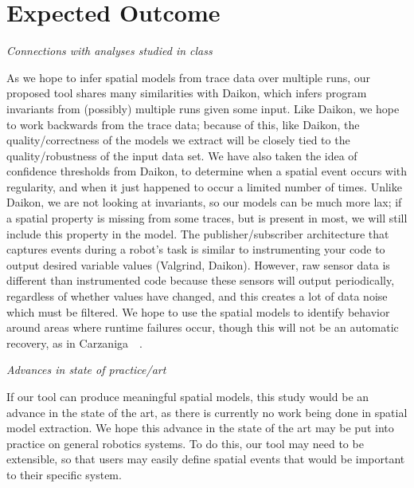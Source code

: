 \section{Expected Outcome} 

\emph{Connections with analyses studied in class}

As we hope to infer spatial models from trace data over multiple runs, our proposed tool shares many similarities with Daikon, which infers program invariants from (possibly) multiple runs given some input.
Like Daikon, we hope to work backwards from the trace data; because of this, like Daikon, the quality/correctness of the models we extract will be closely tied to the quality/robustness of the input data set.
We have also taken the idea of confidence thresholds from Daikon, to determine when a spatial event occurs with regularity, and when it just happened to occur a limited number of times.
Unlike Daikon, we are not looking at invariants, so our models can be much more lax; if a spatial property is missing from some traces, but is present in most, we will still include this property in the model.
The publisher/subscriber architecture that captures events during a robot's task is similar to instrumenting your code to output desired variable values (Valgrind, Daikon).
However, raw sensor data is different than instrumented code because these sensors will output periodically, regardless of whether values have changed, and this creates a lot of data noise which must be filtered.
We hope to use the spatial models to identify behavior around areas where runtime failures occur, though this will not be an automatic recovery, as in Carzaniga~\etal~\cite{carzaniga2013automatic}.

\emph{Advances in state of practice/art}

If our tool can produce meaningful spatial models, this study would be an advance in the state of the art, as there is currently no work being done in spatial model extraction.
We hope this advance in the state of the art may be put into practice on general robotics systems. 
To do this, our tool may need to be extensible, so that users may easily define spatial events that would be important to their specific system.
